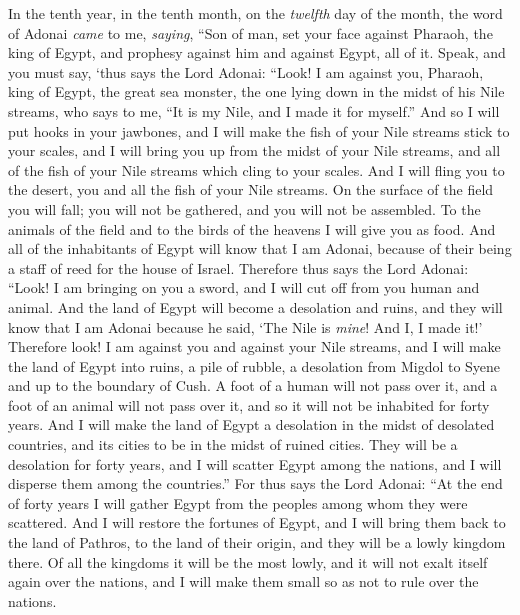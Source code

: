 \begin{biblechapter} %
 In the tenth year, in the tenth month, on the \textit{twelfth} day of the month, the word of Adonai \textit{came} to me, \textit{saying},
\verse “Son of man, set your face against Pharaoh, the king of Egypt, and prophesy against him and against Egypt, all of it.
\verse Speak, and you must say, ‘thus says the Lord Adonai:
\verse “Look! I am against you, 
Pharaoh, king of Egypt, 
the great sea monster, 
the one lying down 
in the midst of his Nile streams, 
who says to me, “It is my Nile, and I made it for myself.”
\verse And so I will put hooks in your jawbones, 
and I will make the fish of your Nile streams stick to your scales, 
and I will bring you up from the midst of your Nile streams, 
and all of the fish of your Nile streams which cling to your scales.
\verse And I will fling you to the desert, 
you and all the fish of your Nile streams. 
On the surface of the field you will fall; 
you will not be gathered, 
and you will not be assembled. 
To the animals of the field 
and to the birds of the heavens 
I will give you as food.
\verse And all of the inhabitants of Egypt will know that I am Adonai, 
because of their being a staff of reed for the house of Israel.
\verse Therefore thus says the Lord Adonai: “Look! I am bringing on you a sword, and I will cut off from you human and animal.
\verse And the land of Egypt will become a desolation and ruins, and they will know that I am Adonai because he said, ‘The Nile is \textit{mine}! And I, I made it!’
\verse Therefore look! I am against you and against your Nile streams, and I will make the land of Egypt into ruins, a pile of rubble, a desolation from Migdol to Syene and up to the boundary of Cush.
\verse A foot of a human will not pass over it, and a foot of an animal will not pass over it, and so it will not be inhabited for forty years.
\verse And I will make the land of Egypt a desolation in the midst of desolated countries, and its cities to be in the midst of ruined cities. They will be a desolation for forty years, and I will scatter Egypt among the nations, and I will disperse them among the countries.”
\verse For thus says the Lord Adonai: “At the end of forty years I will gather Egypt from the peoples among whom they were scattered.
\verse And I will restore the fortunes of Egypt, and I will bring them back to the land of Pathros, to the land of their origin, and they will be a lowly kingdom there.
\verse Of all the kingdoms it will be the most lowly, and it will not exalt itself again over the nations, and I will make them small so as not to rule over the nations.

\end{biblechapter}
